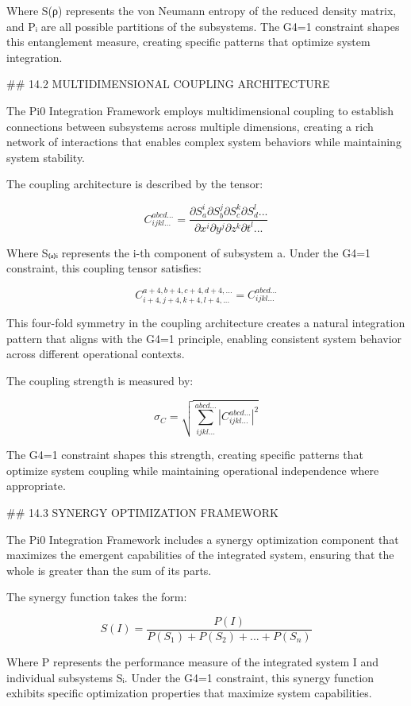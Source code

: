 Where S(ρ) represents the von Neumann entropy of the reduced density matrix, and {Pᵢ} are all possible partitions of the subsystems. The G4=1 constraint shapes this entanglement measure, creating specific patterns that optimize system integration.

## 14.2 MULTIDIMENSIONAL COUPLING ARCHITECTURE

The Pi0 Integration Framework employs multidimensional coupling to establish connections between subsystems across multiple dimensions, creating a rich network of interactions that enables complex system behaviors while maintaining system stability.

The coupling architecture is described by the tensor:

$$C_{ijkl...}^{abcd...} = \frac{\partial S_a^i \partial S_b^j \partial S_c^k \partial S_d^l ...}{\partial x^i \partial y^j \partial z^k \partial t^l ...}$$

Where S₍ₐ₎ᵢ represents the i-th component of subsystem a. Under the G4=1 constraint, this coupling tensor satisfies:

$$C_{i+4,j+4,k+4,l+4,...}^{a+4,b+4,c+4,d+4,...} = C_{ijkl...}^{abcd...}$$

This four-fold symmetry in the coupling architecture creates a natural integration pattern that aligns with the G4=1 principle, enabling consistent system behavior across different operational contexts.

The coupling strength is measured by:

$$\sigma_C = \sqrt{\sum_{ijkl...}^{abcd...} |C_{ijkl...}^{abcd...}|^2}$$

The G4=1 constraint shapes this strength, creating specific patterns that optimize system coupling while maintaining operational independence where appropriate.

## 14.3 SYNERGY OPTIMIZATION FRAMEWORK

The Pi0 Integration Framework includes a synergy optimization component that maximizes the emergent capabilities of the integrated system, ensuring that the whole is greater than the sum of its parts.

The synergy function takes the form:

$$S(I) = \frac{P(I)}{P(S_1) + P(S_2) + ... + P(S_n)}$$

Where P represents the performance measure of the integrated system I and individual subsystems Sᵢ. Under the G4=1 constraint, this synergy function exhibits specific optimization properties that maximize system capabilities.

